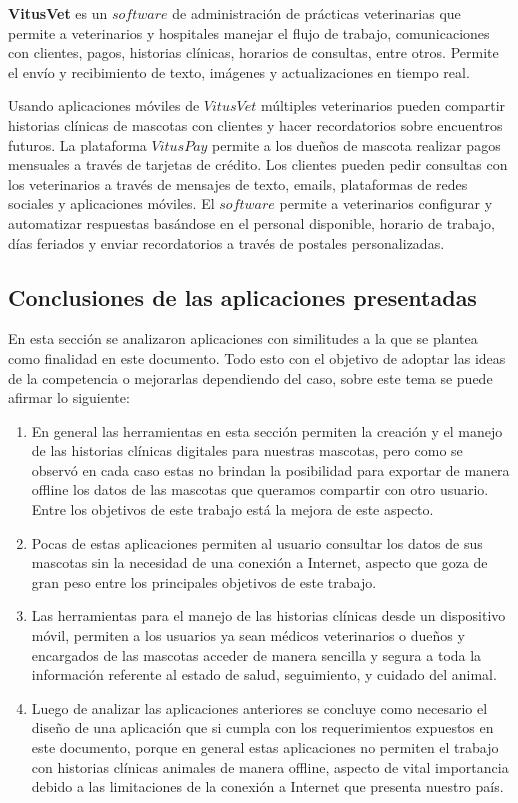 \textbf{VitusVet}  es un $software$ de administración de prácticas veterinarias que permite a veterinarios y hospitales manejar el flujo de trabajo, comunicaciones con clientes, pagos, historias clínicas, horarios de consultas, entre otros. Permite el envío y recibimiento de texto, imágenes y actualizaciones en tiempo real.

Usando aplicaciones móviles de $VitusVet$ múltiples veterinarios pueden compartir historias clínicas de mascotas con clientes y hacer recordatorios sobre encuentros futuros. La plataforma $VitusPay$ permite a los dueños de mascota realizar pagos mensuales a través de tarjetas de crédito. Los clientes pueden pedir consultas con los veterinarios a través de mensajes de texto, emails, plataformas de redes sociales y aplicaciones móviles. El $software$ permite a veterinarios configurar y automatizar respuestas basándose en el personal disponible, horario de trabajo, días feriados y enviar recordatorios a través de postales personalizadas. 





\subsection{Conclusiones de las aplicaciones presentadas}\label{chapter:introduction}

En esta sección se analizaron aplicaciones con similitudes a la que se plantea como finalidad en este documento. Todo esto con el objetivo de adoptar las ideas de la competencia o mejorarlas dependiendo del caso, sobre este tema se puede afirmar lo siguiente:

\begin{enumerate}


\item	En general las herramientas en esta sección permiten la creación y el manejo de las historias clínicas digitales para nuestras mascotas, pero como se observó en cada caso estas no brindan la posibilidad para exportar de manera offline los datos de las mascotas que queramos compartir con otro usuario. Entre los objetivos de este trabajo está la mejora de este aspecto.
\item	Pocas de estas aplicaciones permiten al usuario consultar los datos de sus mascotas sin la necesidad de una conexión a Internet, aspecto que goza de gran peso entre los principales objetivos de este trabajo.
\item	Las herramientas para el manejo de las historias clínicas desde un dispositivo móvil, permiten a los usuarios ya sean médicos veterinarios o dueños y encargados de las mascotas acceder de manera sencilla y segura a toda la información referente al estado de salud, seguimiento, y cuidado del animal.
\item	Luego de analizar las aplicaciones anteriores se concluye como necesario el diseño de una aplicación que si cumpla con los requerimientos expuestos en este documento, porque en general estas aplicaciones no permiten el trabajo con historias clínicas animales de manera offline, aspecto de vital importancia debido a las limitaciones de la conexión a Internet que presenta nuestro país.
\end{enumerate}

